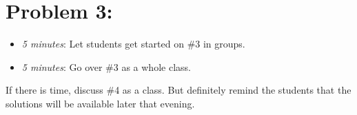 \documentclass[handout,nooutcomes]{ximera}
\begin{document}
	
	
\section*{Problem 3:}

	\begin{itemize}
	
	\item  \emph{5 minutes}:  Let students get started on \#3 in groups. 
	
	\item  \emph{5 minutes}:  Go over \#3 as a whole class.
	
	\end{itemize}
	


If there is time, discuss \#4 as a class.  But definitely remind the students that the solutions will be available later that evening.
	
	

	
	

	
	
	

	
	
	
\end{document}
